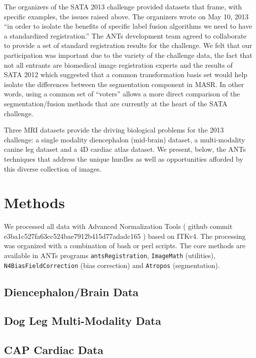 \documentclass{llncs}
\begin{document}
The organizers of the SATA 2013 challenge provided datasets that
frame, with specific examples, the issues raised above.  The
organizers wrote on May 10, 2013 ``in order to isolate the benefits of
specific label fusion algorithms we need to have a standardized
registration.''  The ANTs development team agreed to collaborate to
provide a set of standard registration results for the challenge.  We
felt that our participation was important due to the variety of the challenge
data, the fact that not all entrants are biomedical image registration
experts and the results of SATA 2012 which suggested that a common
transformation basis set would help isolate the differences between
the segmentation component in MASR.  In other words, using a common
set of ``voters'' allows a more direct comparison of the
segmentation/fusion methods that are currently at the heart of the
SATA challenge.

Three MRI datasets provide the driving biological problems for the
2013 challenge: a single modality diencephalon (mid-brain) dataset, a
multi-modality canine leg dataset and a 4D cardiac atlas dataset.  
We present, below, the ANTs techniques that address the unique hurdles as
well as opportunities afforded by this diverse collection of images.


\section{Methods} 
We processed all data with Advanced Normalization Tools ( github commit
e3ba1c527fa63cc524bae7912b415d77adadc165 ) based on ITKv4.  The
processing was organized with a combination of bash or perl scripts.
The core methods are available in ANTs programs \texttt{antsRegistration}, \texttt{ImageMath} (utilities), \texttt{N4BiasFieldCorrection} (bias correction) and
\texttt{Atropos} (segmentation).

\subsection{Diencephalon/Brain Data}

\subsection{Dog Leg Multi-Modality Data}

\subsection{CAP Cardiac Data}
\end{document}
